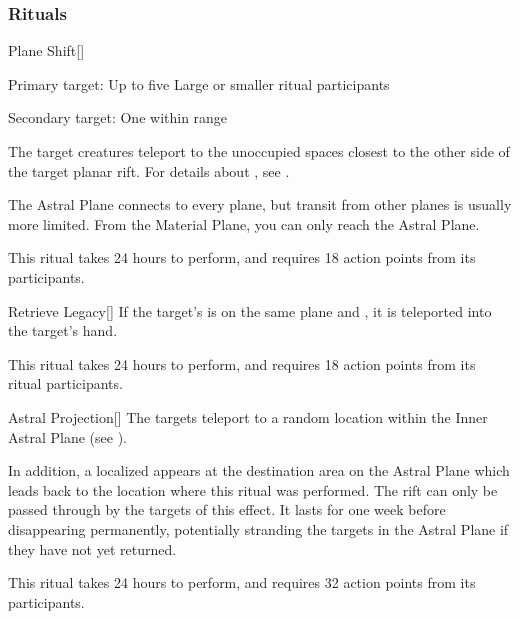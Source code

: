 \subsubsection{Rituals}


\lowercase{\hypertarget{spell:Plane Shift}{}}\label{spell:Plane Shift}
\begin{apability}[Rank 4]{\hypertarget{spell:Plane Shift}{Plane Shift}}[]

Primary target: Up to five Large or smaller ritual participants
\par\noindent
Secondary target: One  within \rngmed range

The target creatures teleport to the unoccupied spaces closest to the other side of the target planar rift.
For details about , see .

The Astral Plane connects to every plane, but transit from other planes is usually more limited.
From the Material Plane, you can only reach the Astral Plane.

This ritual takes 24 hours to perform, and requires 18 action points from its participants.
\end{apability}
\vspace{0.25em}



\lowercase{\hypertarget{spell:Retrieve Legacy}{}}\label{spell:Retrieve Legacy}
\begin{apability}[Rank 4]{\hypertarget{spell:Retrieve Legacy}{Retrieve Legacy}}[]
If the target's  is on the same plane and , it is teleported into the target's hand.

This ritual takes 24 hours to perform, and requires 18 action points from its ritual participants.
\end{apability}
\vspace{0.25em}



\lowercase{\hypertarget{spell:Astral Projection}{}}\label{spell:Astral Projection}
\begin{apability}[Rank 5]{\hypertarget{spell:Astral Projection}{Astral Projection}}[]
The targets teleport to a random location within the Inner Astral Plane (see ).

In addition, a localized  appears at the destination area on the Astral Plane which leads back to the location where this ritual was performed.
The rift can only be passed through by the targets of this effect.
It lasts for one week before disappearing permanently, potentially stranding the targets in the Astral Plane if they have not yet returned.

This ritual takes 24 hours to perform, and requires 32 action points from its participants.
\end{apability}
\vspace{0.25em}



